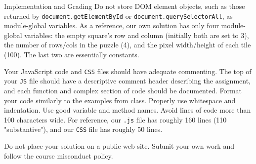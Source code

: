 \documentclass[programming]{../../../../mfcs}
\begin{document}
\begin{question}{Implementation and Grading}
Do not store DOM element objects, such as those returned by
\texttt{document.getElementById} or \texttt{document.querySelectorAll}, as module-global variables. As a reference, our
own solution has only four module-global variables: the empty square's row and column (initially both are set to 3),
the number of rows/cols in the puzzle (4), and the pixel width/height of each tile (100). The last two are essentially
constants.
\newline

Your JavaScript code and \texttt{CSS} files should have adequate commenting. The top of your
\texttt{JS} file should have a descriptive
comment header describing the assignment, and each function and complex section of code should be documented.
Format your code similarly to the examples from class. Properly use whitespace and indentation. Use good
variable and method names. Avoid lines of code more than 100 characters wide. For reference, our \texttt{.js} file has
roughly 160 lines (110 "substantive"), and our \texttt{CSS} file has roughly 50 lines.
\newline

Do not place your solution on a public web site. Submit your own work and follow the course misconduct policy.
\end{question}
\end{document}
